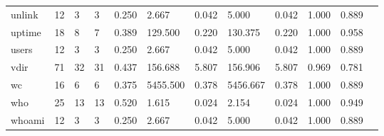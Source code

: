 \begin{longtable}{lp{1.00cm}p{1.00cm}p{1.00cm}p{1.00cm}p{1.00cm}p{1.00cm}p{1.00cm}p{1.00cm}p{1.00cm}p{1.00cm}p{1.00cm}}
unlink    &                           12 &                  3 &                                 3 &                                      0.250 &                                  2.667 &                                        0.042 &                             5.000 &                                   0.042 &                        1.000 &                                        0.889 \\
uptime    &                           18 &                  8 &                                 7 &                                      0.389 &                                129.500 &                                        0.220 &                           130.375 &                                   0.220 &                        1.000 &                                        0.958 \\
users     &                           12 &                  3 &                                 3 &                                      0.250 &                                  2.667 &                                        0.042 &                             5.000 &                                   0.042 &                        1.000 &                                        0.889 \\
vdir      &                           71 &                 32 &                                31 &                                      0.437 &                                156.688 &                                        5.807 &                           156.906 &                                   5.807 &                        0.969 &                                        0.781 \\
wc        &                           16 &                  6 &                                 6 &                                      0.375 &                               5455.500 &                                        0.378 &                          5456.667 &                                   0.378 &                        1.000 &                                        0.889 \\
who       &                           25 &                 13 &                                13 &                                      0.520 &                                  1.615 &                                        0.024 &                             2.154 &                                   0.024 &                        1.000 &                                        0.949 \\
whoami    &                           12 &                  3 &                                 3 &                                      0.250 &                                  2.667 &                                        0.042 &                             5.000 &                                   0.042 &                        1.000 &                                        0.889 \\

\end{longtable}
